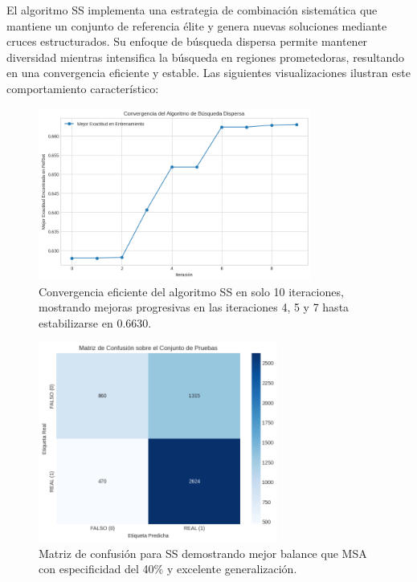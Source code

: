 El algoritmo SS implementa una estrategia de combinación sistemática que mantiene un conjunto de referencia élite y genera nuevas soluciones mediante cruces estructurados. Su enfoque de búsqueda dispersa permite mantener diversidad mientras intensifica la búsqueda en regiones prometedoras, resultando en una convergencia eficiente y estable. Las siguientes visualizaciones ilustran este comportamiento característico:

\begin{figure}[h!]
    \centering
    \includegraphics[width=0.8\textwidth]{Imagenes/convergencia_ss.png}
    \caption{Convergencia eficiente del algoritmo SS en solo 10 iteraciones, mostrando mejoras progresivas en las iteraciones 4, 5 y 7 hasta estabilizarse en 0.6630.}
    \label{fig:convergencia_ss}
\end{figure}

\begin{figure}[h!]
    \centering
    \includegraphics[width=0.7\textwidth]{Imagenes/matriz_confusion_ss.png}
    \caption{Matriz de confusión para SS demostrando mejor balance que MSA con especificidad del 40\% y excelente generalización.}
    \label{fig:matriz_ss}
\end{figure}


